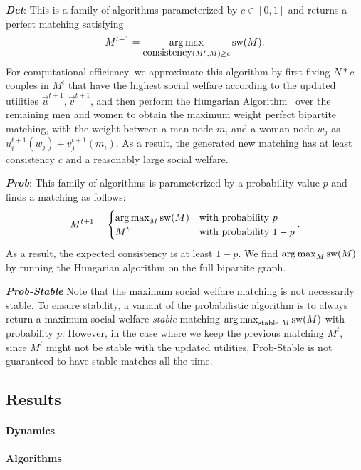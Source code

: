 \textit{\textbf{Det}}: This is a family of algorithms parameterized by $c \in [0, 1]$ and returns a perfect matching satisfying $$M^{t+1} = \operatorname*{arg\,max}_{\mbox{consistency}(M^t, M) \ge c}{\mbox{sw}(M)}.$$
For computational efficiency, we approximate this algorithm by first fixing $N * c$ couples in $M^t$ that have the highest social welfare according to the updated utilities $\overrightarrow{u}^{t+1}, \overrightarrow{v}^{t+1}$, and then perform the Hungarian Algorithm~\cite{Kuhn55thehungarian,Kuhn56thehungarian,Munkres1957Assignment} over the remaining men and women to obtain the maximum weight perfect bipartite matching, with the weight between a man node $m_i$ and a woman node $w_j$ as $u_i^{t+1}(w_j) + v_j^{t+1}(m_i)$. As a result, the generated new matching has at least consistency $c$ and a reasonably large social welfare.

\textit{\textbf{Prob}}: This family of algorithms is parameterized by a probability value $p$ and finds a matching as follows:
$$M^{t+1} = \begin{cases} \operatorname*{arg\,max}_M{\mbox{sw}(M)} &\text{with probability $p$}\\ M^t &\text{with probability $1-p$}\end{cases}.$$
As a result, the expected consistency is at least $1-p$. We find $\operatorname*{arg\,max}_M{\mbox{sw}(M)}$ by running the Hungarian algorithm on the full bipartite graph.

\textit{\textbf{Prob-Stable}} Note that the maximum social welfare matching is not necessarily stable. To ensure stability, a variant of the probabilistic algorithm is to always return a maximum social welfare \textit{stable} matching $\operatorname*{arg\,max}_{\text{stable $M$}}{\mbox{sw}(M)}$ with probability $p$. However, in the case where we keep the previous matching $M^t$, since $M^t$ might not be stable with the updated utilities, Prob-Stable is not guaranteed to have stable matches all the time.


\subsection{Results}
\paragraph{Dynamics}

\paragraph{Algorithms}

